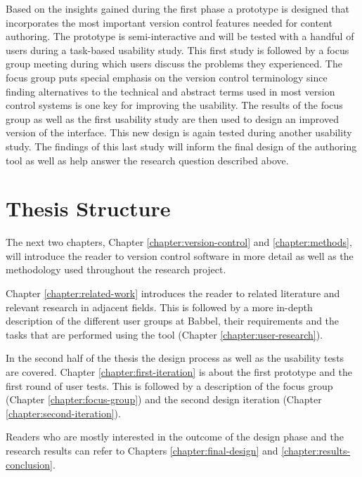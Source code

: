 Based on the insights gained during the first phase a prototype is designed that incorporates the most important version control features needed for content authoring. The prototype is semi-interactive and will be tested with a handful of users during a task-based usability study. This first study is followed by a focus group meeting during which users discuss the problems they experienced. The focus group puts special emphasis on the version control terminology since finding alternatives to the technical and abstract terms used in most version control systems is one key for improving the usability. The results of the focus group as well as the first usability study are then used to design an improved version of the interface. This new design is again tested during another usability study. The findings of this last study will inform the final design of the authoring tool as well as help answer the research question described above.


\section{Thesis Structure}
The next two chapters, Chapter \ref{chapter:version-control} and \ref{chapter:methods}, will introduce the reader to version control software in more detail as well as the methodology used throughout the research project.

Chapter \ref{chapter:related-work} introduces the reader to related literature and relevant research in adjacent fields. This is followed by a more in-depth description of the different user groups at Babbel, their requirements and the tasks that are performed using the tool (Chapter \ref{chapter:user-research}).

In the second half of the thesis the design process as well as the usability tests are covered. Chapter \ref{chapter:first-iteration} is about the first prototype and the first round of user tests. This is followed by a description of the focus group (Chapter \ref{chapter:focus-group}) and the second design iteration (Chapter \ref{chapter:second-iteration}).

Readers who are mostly interested in the outcome of the design phase and the research results can refer to Chapters \ref{chapter:final-design} and \ref{chapter:results-conclusion}.




